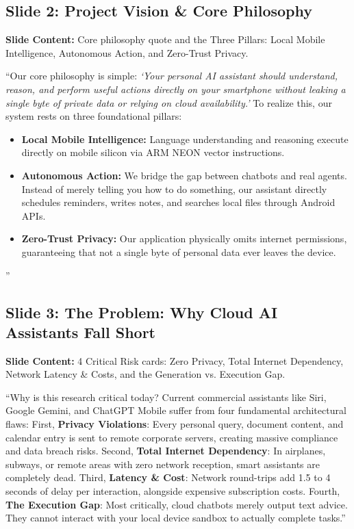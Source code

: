 \documentclass[11pt,a4paper]{article}
\begin{document}
\subsection{Slide 2: Project Vision \& Core Philosophy}
\textbf{Slide Content:} Core philosophy quote and the Three Pillars: Local Mobile Intelligence, Autonomous Action, and Zero-Trust Privacy.

\begin{scriptbox}
``Our core philosophy is simple: \textit{`Your personal AI assistant should understand, reason, and perform useful actions directly on your smartphone without leaking a single byte of private data or relying on cloud availability.'}
To realize this, our system rests on three foundational pillars:
\begin{itemize}[leftmargin=*]
  \item \textbf{Local Mobile Intelligence:} Language understanding and reasoning execute directly on mobile silicon via ARM NEON vector instructions.
  \item \textbf{Autonomous Action:} We bridge the gap between chatbots and real agents. Instead of merely telling you how to do something, our assistant directly schedules reminders, writes notes, and searches local files through Android APIs.
  \item \textbf{Zero-Trust Privacy:} Our application physically omits internet permissions, guaranteeing that not a single byte of personal data ever leaves the device.
\end{itemize}''
\end{scriptbox}

\subsection{Slide 3: The Problem: Why Cloud AI Assistants Fall Short}
\textbf{Slide Content:} 4 Critical Risk cards: Zero Privacy, Total Internet Dependency, Network Latency \& Costs, and the Generation vs. Execution Gap.

\begin{scriptbox}
``Why is this research critical today? Current commercial assistants like Siri, Google Gemini, and ChatGPT Mobile suffer from four fundamental architectural flaws:
First, \textbf{Privacy Violations}: Every personal query, document content, and calendar entry is sent to remote corporate servers, creating massive compliance and data breach risks.
Second, \textbf{Total Internet Dependency}: In airplanes, subways, or remote areas with zero network reception, smart assistants are completely dead.
Third, \textbf{Latency \& Cost}: Network round-trips add 1.5 to 4 seconds of delay per interaction, alongside expensive subscription costs.
Fourth, \textbf{The Execution Gap}: Most critically, cloud chatbots merely output text advice. They cannot interact with your local device sandbox to actually complete tasks.''
\end{scriptbox}
\end{document}

